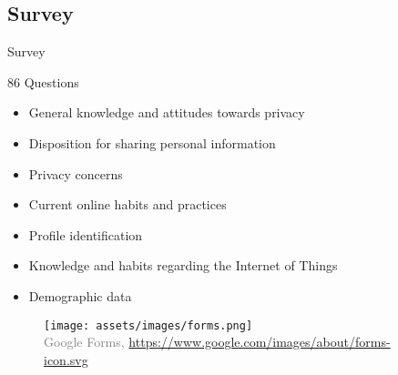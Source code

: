\documentclass[xcolor={svgnames},compress,aspectratio=169]{beamer}
\begin{document}
\subsection{Survey}

\begin{frame}[shrink]{Survey}
    \begin{multicols}{2}
        86 Questions
        \begin{itemize}
            \item General knowledge and attitudes towards privacy
            \item Disposition for sharing personal information
            \item Privacy concerns
            \item Current online habits and practices
            \item Profile identification
            \item Knowledge and habits regarding the Internet of Things
            \item Demographic data
        \end{itemize}

        \columnbreak
        \vspace*{\fill}
        \begin{figure}
            \centering\texttt{[image: assets/images/forms.png]}\\
            \textcolor{gray}{{\tiny Google Forms, \href{https://www.google.com/images/about/forms-icon.svg}{https://www.google.com/images/about/forms-icon.svg}}}
        \end{figure}
        \vspace*{\fill}
    \end{multicols}
\end{frame}

\end{document}
